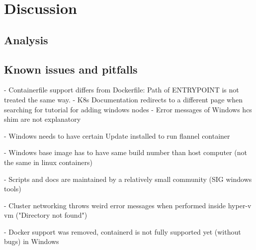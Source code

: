 \chapter{Discussion} %

\label{chap:discussion} %



\section{Analysis}

\section{Known issues and pitfalls}

- Containerfile support differs from Dockerfile: Path of ENTRYPOINT is not treated the same way.
- K8s Documentation redirects to a different page when searching for tutorial for adding windows nodes
- Error messages of Windows hcs shim are not explanatory

- Windows needs to have certain Update installed to run flannel container

- Windows base image has to have same build number than host computer (not the same in linux containers)

- Scripts and docs are maintained by a relatively small community (SIG windows tools)

- Cluster networking throws weird error messages when performed inside hyper-v vm ("Directory not found")

- Docker support was removed, containerd is not fully supported yet (without bugs) in Windows